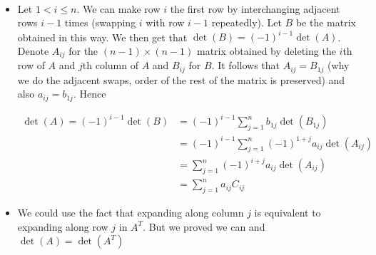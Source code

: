 \documentclass{report}
\begin{document}
\begin{myproof}
    ~\\
    \begin{itemize}
        \item Let $1 < i \le n$. We can make row  $i$ the first row by interchanging adjacent rows  $i-1$ times (swapping $i$ with row  $i-1$ repeatedly). Let  $B$ be the matrix obtained in this way. We then get that $\det (B) = (-1)^{i-1} \det (A)$. Denote $A_{ij}$ for the  $(n-1) \times (n-1)$ matrix obtained by deleting the $i$th row of $A$ and $j$th column of $A$ and $B_{ij}$ for $B$. It follows that  $A_{ij} = B_{1j} $ (why we do the adjacent swaps, order of the rest of the matrix is preserved) and also  $a_{ij} = b_{1j}$. Hence
            \begin{center}
                \[
            \begin{aligned}
                \det (A) = (-1)^{i-1}\det (B) & = (-1)^{i-1} \sum_{j=1}^{n} b_{1j} \det (B_{1j}) \\
                                            & = (-1)^{i-1} \sum_{j=1}^{n} (-1)^{1+j}a_{ij} \det (A_{ij}) \\
                                            & = \sum_{j=1}^{n} (-1)^{i+j}a_{ij} \det (A_{ij}) \\
                                            &  = \sum_{j=1}^{n} a_{ij}C_{ij}
            \end{aligned}
                \]
            \end{center}
        \item We could use the fact that expanding along column $j$ is equivalent to expanding along row  $j$ in  $A^T$.  But we proved we can and $\det (A) = \det (A^T)$ 
    \end{itemize}
\end{myproof}

\newpage 
{}
\end{document}
